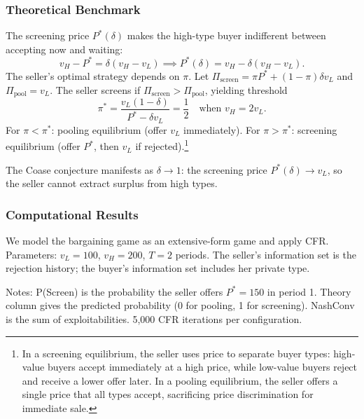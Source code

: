 \subsubsection{Theoretical Benchmark}

The screening price $P^*(\delta)$ makes the high-type buyer indifferent between accepting now and waiting:
\begin{equation}
v_H - P^* = \delta(v_H - v_L) \implies P^*(\delta) = v_H - \delta(v_H - v_L).
\end{equation}
The seller's optimal strategy depends on $\pi$. Let $\Pi_{\text{screen}} = \pi P^* + (1-\pi)\delta v_L$ and $\Pi_{\text{pool}} = v_L$. The seller screens if $\Pi_{\text{screen}} > \Pi_{\text{pool}}$, yielding threshold
\begin{equation}
\pi^* = \frac{v_L(1-\delta)}{P^* - \delta v_L} = \frac{1}{2} \quad \text{when } v_H = 2v_L.
\end{equation}
For $\pi < \pi^*$: pooling equilibrium (offer $v_L$ immediately). For $\pi > \pi^*$: screening equilibrium (offer $P^*$, then $v_L$ if rejected).\footnote{In a screening equilibrium, the seller uses price to separate buyer types: high-value buyers accept immediately at a high price, while low-value buyers reject and receive a lower offer later. In a pooling equilibrium, the seller offers a single price that all types accept, sacrificing price discrimination for immediate sale.}

The Coase conjecture manifests as $\delta \to 1$: the screening price $P^*(\delta) \to v_L$, so the seller cannot extract surplus from high types.

\subsubsection{Computational Results}

We model the bargaining game as an extensive-form game and apply CFR. Parameters: $v_L = 100$, $v_H = 200$, $T = 2$ periods. The seller's information set is the rejection history; the buyer's information set includes her private type.

\begin{table}[htbp]
\centering
\caption{CFR Equilibrium vs. Theory: $\pi$-sweep at $\delta = 0.5$}
\label{tab:coase}

\begin{minipage}{0.9\textwidth}
\footnotesize
Notes: P(Screen) is the probability the seller offers $P^* = 150$ in period 1. Theory column gives the predicted probability (0 for pooling, 1 for screening). NashConv is the sum of exploitabilities. 5,000 CFR iterations per configuration.
\end{minipage}
\end{table}

